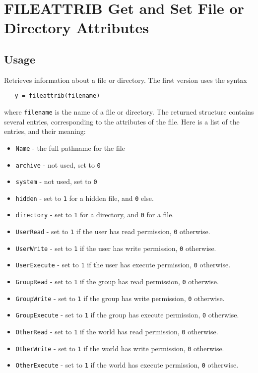 \section{FILEATTRIB Get and Set File or Directory Attributes}

\subsection{Usage}

Retrieves information about a file or directory. The first version
uses the syntax
\begin{verbatim}
   y = fileattrib(filename)
\end{verbatim}
where \verb|filename| is the name of a file or directory.  The returned
structure contains several entries, corresponding to the attributes
of the file.  Here is a list of the entries, and their meaning:
\begin{itemize}
\item  \verb|Name| - the full pathname for the file

\item  \verb|archive| - not used, set to \verb|0|

\item  \verb|system| - not used, set to \verb|0|

\item  \verb|hidden| - set to \verb|1| for a hidden file, and \verb|0| else.

\item  \verb|directory| - set to \verb|1| for a directory, and \verb|0| for a file.

\item  \verb|UserRead| - set to \verb|1| if the user has read permission, \verb|0| otherwise.

\item  \verb|UserWrite| - set to \verb|1| if the user has write permission, \verb|0| otherwise.

\item  \verb|UserExecute| - set to \verb|1| if the user has execute permission, \verb|0| otherwise.

\item  \verb|GroupRead| - set to \verb|1| if the group has read permission, \verb|0| otherwise.

\item  \verb|GroupWrite| - set to \verb|1| if the group has write permission, \verb|0| otherwise.

\item  \verb|GroupExecute| - set to \verb|1| if the group has execute permission, \verb|0| otherwise.

\item  \verb|OtherRead| - set to \verb|1| if the world has read permission, \verb|0| otherwise.

\item  \verb|OtherWrite| - set to \verb|1| if the world has write permission, \verb|0| otherwise.

\item  \verb|OtherExecute| - set to \verb|1| if the world has execute permission, \verb|0| otherwise.

\end{itemize}
